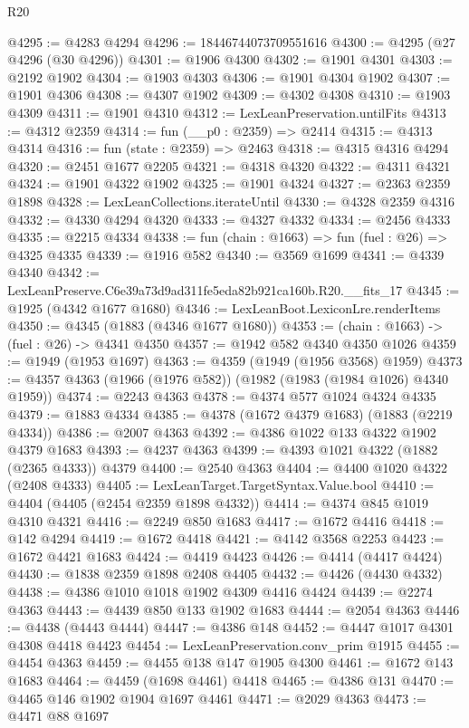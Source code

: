 \begin{lexlean}{R20}
\begin{coremodule}
@4295 := @4283 @4294
@4296 := 18446744073709551616
@4300 := @4295 (@27 @4296 (@30 @4296))
@4301 := @1906 @4300
@4302 := @1901 @4301
@4303 := @2192 @1902
@4304 := @1903 @4303
@4306 := @1901 @4304 @1902
@4307 := @1901 @4306
@4308 := @4307 @1902
@4309 := @4302 @4308
@4310 := @1903 @4309
@4311 := @1901 @4310
@4312 := LexLeanPreservation.untilFits
@4313 := @4312 @2359
@4314 := fun (__p0 : @2359) => @2414
@4315 := @4313 @4314
@4316 := fun (state : @2359) => @2463
@4318 := @4315 @4316 @4294
@4320 := @2451 @1677 @2205
@4321 := @4318 @4320
@4322 := @4311 @4321
@4324 := @1901 @4322 @1902
@4325 := @1901 @4324
@4327 := @2363 @2359 @1898
@4328 := LexLeanCollections.iterateUntil
@4330 := @4328 @2359 @4316
@4332 := @4330 @4294 @4320
@4333 := @4327 @4332
@4334 := @2456 @4333
@4335 := @2215 @4334
@4338 := fun (chain : @1663) => fun (fuel : @26) => @4325 @4335
@4339 := @1916 @582
@4340 := @3569 @1699
@4341 := @4339 @4340
@4342 := LexLeanPreserve.C6e39a73d9ad311fe5eda82b921ca160b.R20.__fits_17
@4345 := @1925 (@4342 @1677 @1680)
@4346 := LexLeanBoot.LexiconLre.renderItems
@4350 := @4345 (@1883 (@4346 @1677 @1680))
@4353 := (chain : @1663) -> (fuel : @26) -> @4341 @4350
@4357 := @1942 @582 @4340 @4350 @1026
@4359 := @1949 (@1953 @1697)
@4363 := @4359 (@1949 (@1956 @3568) @1959)
@4373 := @4357 @4363 (@1966 (@1976 @582)) (@1982 (@1983 (@1984 @1026) @4340 @1959))
@4374 := @2243 @4363
@4378 := @4374 @577 @1024 @4324 @4335
@4379 := @1883 @4334
@4385 := @4378 (@1672 @4379 @1683) (@1883 (@2219 @4334))
@4386 := @2007 @4363
@4392 := @4386 @1022 @133 @4322 @1902 @4379 @1683
@4393 := @4237 @4363
@4399 := @4393 @1021 @4322 (@1882 (@2365 @4333)) @4379
@4400 := @2540 @4363
@4404 := @4400 @1020 @4322 (@2408 @4333)
@4405 := LexLeanTarget.TargetSyntax.Value.bool
@4410 := @4404 (@4405 (@2454 @2359 @1898 @4332))
@4414 := @4374 @845 @1019 @4310 @4321
@4416 := @2249 @850 @1683
@4417 := @1672 @4416
@4418 := @142 @4294
@4419 := @1672 @4418
@4421 := @4142 @3568 @2253
@4423 := @1672 @4421 @1683
@4424 := @4419 @4423
@4426 := @4414 (@4417 @4424)
@4430 := @1838 @2359 @1898 @2408 @4405
@4432 := @4426 (@4430 @4332)
@4438 := @4386 @1010 @1018 @1902 @4309 @4416 @4424
@4439 := @2274 @4363
@4443 := @4439 @850 @133 @1902 @1683
@4444 := @2054 @4363
@4446 := @4438 (@4443 @4444)
@4447 := @4386 @148
@4452 := @4447 @1017 @4301 @4308 @4418 @4423
@4454 := LexLeanPreservation.conv_prim @1915
@4455 := @4454 @4363
@4459 := @4455 @138 @147 @1905 @4300
@4461 := @1672 @143 @1683
@4464 := @4459 (@1698 @4461) @4418
@4465 := @4386 @131
@4470 := @4465 @146 @1902 @1904 @1697 @4461
@4471 := @2029 @4363
@4473 := @4471 @88 @1697

\end{coremodule}
\end{lexlean}
